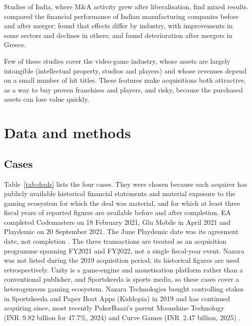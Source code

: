 \documentclass[11pt]{article}
\newcommand{\INR}{INR~}
\begin{document}
Studies of India, where M\&A activity grew after liberalisation, find mixed results. \citet{vanitha2007} compared the financial performance of Indian manufacturing companies before and after merger; \citet{mantravadi2008} found that effects differ by industry, with improvements in some sectors and declines in others; and \citet{pazarskis2006} found deterioration after mergers in Greece.

Few of these studies cover the video-game industry, whose assets are largely intangible (intellectual property, studios and players) and whose revenues depend on a small number of hit titles. These features make acquisitions both attractive, as a way to buy proven franchises and players, and risky, because the purchased assets can lose value quickly.

\section{Data and methods}\label{sec:methods}

\subsection{Cases}

Table~\ref{tab:deals} lists the four cases. They were chosen because each acquirer has publicly available historical financial statements and material exposure to the gaming ecosystem for which the deal was material, and for which at least three fiscal years of reported figures are available before and after completion. EA completed Codemasters on 18 February 2021, Glu Mobile in April 2021 and Playdemic on 20 September 2021. The June Playdemic date was its agreement date, not completion \citep{eacodemasters,eaplaydemic}. The three transactions are treated as an acquisition programme spanning FY2021 and FY2022, not a single fiscal-year event. Nazara was not listed during the 2019 acquisition period; its historical figures are used retrospectively. Unity is a game-engine and monetisation platform rather than a conventional publisher, and Sportskeeda is sports media, so these cases cover a heterogeneous gaming ecosystem. Nazara Technologies bought controlling stakes in Sportskeeda and Paper Boat Apps (Kiddopia) in 2019 and has continued acquiring since, most recently PokerBaazi's parent Moonshine Technology (\INR 9.82 billion for 47.7\%, 2024) and Curve Games (\INR 2.47 billion, 2025) \citep{bs2024nazara,bs2025nazara}.
\end{document}

